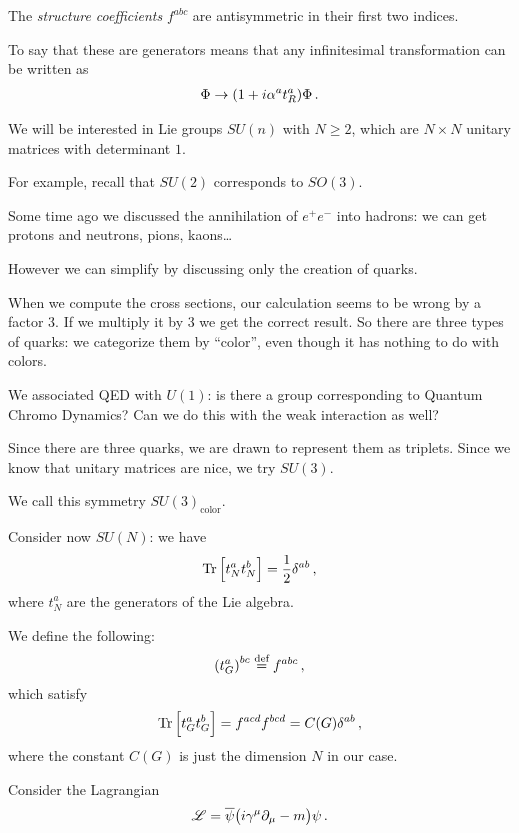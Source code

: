 \documentclass[main.tex]{subfiles}
\begin{document}
The \emph{structure coefficients} \(f^{abc}\) are antisymmetric in their first two indices. 

To say that these are generators means that any infinitesimal transformation can be written as 
%
\begin{align}
\Phi \to \qty(1 + i \alpha^{a} t^{a}_{R}) \Phi 
\,.
\end{align}

We will be interested in Lie groups \(SU(n)\) with \(N\geq 2\), which are \(N \times N\) unitary matrices with determinant \(1\).

For example, recall that \(SU(2)\) corresponds to \(SO(3)\). 

Some time ago we discussed the annihilation  of \(e^{+} e^{-}\) into hadrons: we can get protons and neutrons, pions, kaons\dots

However we can simplify by discussing only the creation of quarks. 

When we compute the cross sections, our calculation seems to be wrong by a factor 3. If we multiply it by 3 we get the correct result. 
So there are three types of quarks: we categorize them by ``color'', even though it has nothing to do with colors. 

We associated QED  with \(U(1)\): is there a group corresponding to Quantum Chromo Dynamics?
Can we do this with the weak interaction as well? 

Since there are three quarks, we are drawn to represent them as triplets. 
Since we know that unitary matrices are nice, we try \(SU(3)\). 

We call this symmetry \(SU(3)_{\text{color}}\). 

Consider now \(SU(N)\): we have 
%
\begin{align}
\Tr \qty[t^{a}_{N} t^{b}_{N}] = \frac{1}{2} \delta^{ab}
\,,
\end{align}
%
where \(t^{a}_{N}\) are the generators of the Lie algebra. 

We define the following: 
%
\begin{align}
\qty(t^{a}_{G})^{bc} \overset{\text{def}}{=} f^{abc}
\,,
\end{align}
%
which satisfy 
%
\begin{align}
\Tr \qty[t^{a}_{G} t^{b}_{G}] = f^{acd} f^{bcd} = C(G) \delta^{ab}
\,,
\end{align}
%
where the constant \(C(G)\) is just the dimension \(N\) in our case. 

Consider the Lagrangian 
%
\begin{align}
\mathscr{L} = \overline{\psi} \qty(i \gamma^{\mu } \partial_{\mu } - m ) \psi 
\,.
\end{align}
\end{document}
